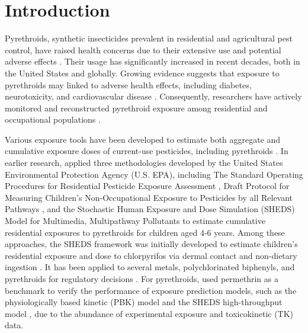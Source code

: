 \documentclass[toxics,article,submit,pdftex,moreauthors]{Definitions/mdpi}
\begin{document}
\section{Introduction}\label{introduction}

Pyrethroids, synthetic insecticides prevalent in residential and agricultural
pest control, have raised health concerns due to their extensive use and
potential adverse effects \citep{burns2018pyrethroid}. Their usage has
significantly increased in recent decades, both in the United States and
globally. Growing evidence suggests that exposure to pyrethroids may linked to
adverse health effects, including diabetes, neurotoxicity, and cardiovascular
disease \citep{park2019environmental, bao2020association,
kim2021environmental}. Consequently, researchers have actively
monitored and reconstructed pyrethroid exposure among residential and
occupational populations \citep{zartarian2012quantifying,
bravo2022occupational}.

Various exposure tools have been developed to estimate both aggregate
and cumulative exposure doses of current-use pesticides, including
pyrethroids
\citep{tulve2011methodologies, zartarian2012quantifying, xue2014epa}. In
earlier research, \citet{tulve2011methodologies} applied three methodologies
developed by the United States Environmental Protection Agency (U.S. EPA),
including The Standard Operating Procedures for Residential Pesticide Exposure
Assessment \citep{us2012standard}, Draft Protocol for Measuring Children's
Non-Occupational Exposure to Pesticides by all Relevant Pathways
\citep{us2001draft}, and the Stochastic Human Exposure and Dose Simulation
(SHEDS) Model for Multimedia, Multipathway Pollutants to estimate cumulative
residential exposures to pyrethroids for children aged 4-6 years. Among these
approaches, the SHEDS framework was initially developed to estimate children's
residential exposure and dose to chlorpyrifos via dermal contact and
non-dietary ingestion \citep{zartarian2000modeling}. It has been applied to
several metals, polychlorinated biphenyls, and pyrethroids for regulatory
decisions \citep{tulve2011methodologies, xue2015modeling,
zartarian2017children}. For pyrethroids, \citet{zartarian2012quantifying} used
permethrin as a benchmark to verify the performance of exposure prediction
models, such as the physiologically based kinetic (PBK) model
\citep{tornero2012pharmacokinetic} and the SHEDS high-throughput model
\citep{isaacs2014sheds}, due to the abundance of experimental exposure and
toxicokinetic (TK) data.
\end{document}
